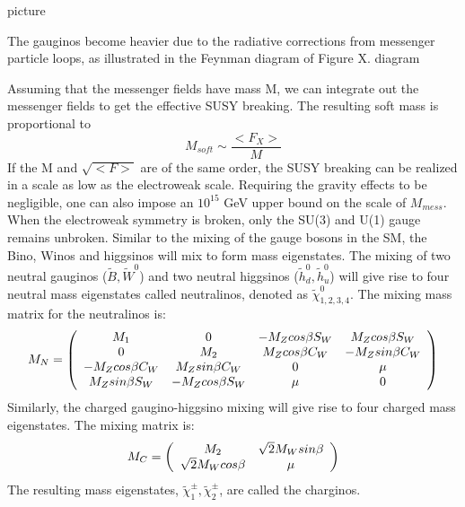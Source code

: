 \documentclass[thesis.tex]{subfiles}
\begin{document}
picture

The gauginos become heavier due to the radiative corrections from messenger particle loops, as illustrated in the Feynman diagram of Figure X. 
 	diagram

Assuming that the messenger fields have mass M, we can integrate out the messenger fields to get the effective SUSY breaking. 
The resulting soft mass is proportional to
	\begin{equation}
		M_{soft} \sim  \frac{<F_X>}{M}
	\end{equation}
If the M and $\sqrt{ <F>}$ are of the same order, the SUSY breaking can be realized in a scale as low as the electroweak scale. 
Requiring the gravity effects to be negligible, one can also impose an $10^{15}$ GeV upper bound on the scale of $M_{mess}$. \\

When the electroweak symmetry is broken, only the SU(3) and U(1) gauge remains unbroken. 
Similar to the mixing of the gauge bosons in the SM, the Bino, Winos and higgsinos will mix to form mass eigenstates.
The mixing of two neutral gauginos ($\tilde{B}, \tilde{W}^0$) and two neutral higgsinos ($\tilde{h}_d^0, \tilde{h}_u^0$) will give rise to four neutral mass eigenstates called neutralinos, denoted as $\tilde{\chi}^0_{1,2,3,4}$. The mixing mass matrix for the neutralinos is: 
	\begin{equation}
		 M_N  = \left(
			 \begin{array}{c c c c }
			 	 M_1                           & 0                                & -M_Z cos\beta S_W & M_Z cos\beta S_W  \\
				   0                                & M_2                          & M_Zcos\beta C_W   & -M_Zsin\beta C_W  \\
				 -M_Z cos\beta C_W  & M_Z sin\beta C_W   & 0                                &  \mu \\
				 M_Z sin\beta S_W     & -M_Z cos\beta S_W  & \mu                          &  0
			\end{array}
		\right)
	\end{equation}
Similarly, the charged gaugino-higgsino mixing will give rise to four charged mass eigenstates.
The mixing matrix is: 
	\begin{equation}
		M_C = \left(
			\begin{array}{c c }
				M_2            & \sqrt{2}M_W sin\beta \\
				\sqrt{2}M_W cos\beta     &  \mu   
			\end{array}
		\right)
	\end{equation}
The resulting mass eigenstates, $\tilde{\chi}^\pm_1, \tilde{\chi}^\pm_2$, are called the charginos.
\end{document}
